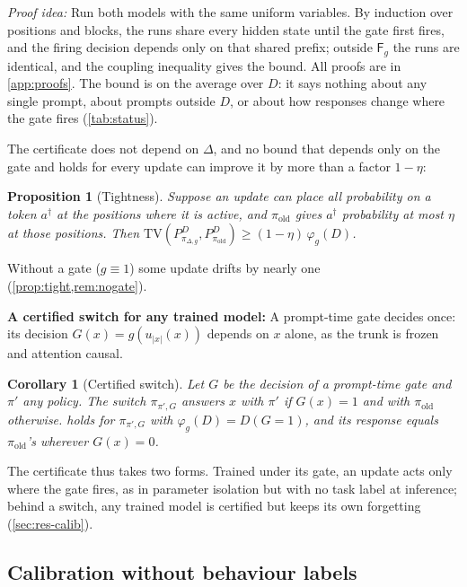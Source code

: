 \documentclass{article}
\theoremstyle{plain}
\newtheorem{proposition}[theorem]{Proposition}
\newtheorem{corollary}[theorem]{Corollary}
\theoremstyle{definition}
\theoremstyle{remark}
\newcommand{\TV}{\mathrm{TV}}
\newcommand{\pold}{\pi_{\mathrm{old}}}
\newcommand{\Fire}{\mathsf{F}}
\begin{document}
\emph{Proof idea:} Run both models with the same uniform variables. By induction over positions and blocks, the runs
share every hidden state until the gate first fires, and the firing decision depends only on that shared prefix;
outside $\Fire_g$ the runs are identical, and the coupling inequality \citep{lindvall1992coupling} gives the bound.
All proofs are in \cref{app:proofs}. The bound is on the average over $D$: it says nothing about any single prompt, about prompts outside $D$, or about how responses change where the gate fires (\cref{tab:status}).

The certificate does not depend on $\Delta$, and no bound that depends only on the gate and holds for every
update can improve it by more than a factor $1-\eta$:

\begin{proposition}[Tightness]
\label{prop:tight}
Suppose an update can place all probability on a token $a^\dagger$ at the positions where it is active, and
$\pold$ gives $a^\dagger$ probability at most $\eta$ at those positions. Then
$\TV(P^D_{\pi_{\Delta,g}},P^D_{\pold})\ge(1-\eta)\,\varphi_g(D)$.
\end{proposition}

Without a gate ($g\equiv1$) some update drifts by nearly one (\cref{prop:tight,rem:nogate}).

\textbf{A certified switch for any trained model:} A prompt-time gate decides once: its decision
$G(x)=g(u_{|x|}(x))$ depends on $x$ alone, as the trunk is frozen and attention causal.

\begin{corollary}[Certified switch]
\label{cor:switch}
Let $G$ be the decision of a prompt-time gate and $\pi'$ any policy. The switch $\pi_{\pi',G}$ answers $x$ with
$\pi'$ if $G(x)=1$ and with $\pold$ otherwise.  holds for $\pi_{\pi',G}$ with
$\varphi_g(D)=D(G=1)$, and its response equals $\pold$'s wherever $G(x)=0$.
\end{corollary}

The certificate thus takes two forms. Trained under its gate, an update acts only where the gate fires, as in
parameter isolation \citep{aljundi2017expertgate,liang2025gainlora} but with no task label at inference; behind a
switch, any trained model is certified but keeps its own forgetting (\cref{sec:res-calib}).

\subsection{Calibration without behaviour labels}
\end{document}
